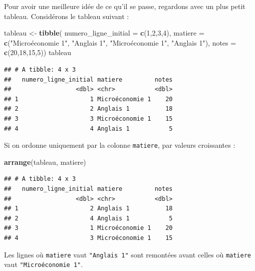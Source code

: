 \documentclass[
  11pt,
]{book}
\newenvironment{Shaded}{\begin{snugshade}}{\end{snugshade}}
\newcommand{\AttributeTok}[1]{\textcolor[rgb]{0.13,0.29,0.53}{#1}}
\newcommand{\DecValTok}[1]{\textcolor[rgb]{0.00,0.00,0.81}{#1}}
\newcommand{\FunctionTok}[1]{\textcolor[rgb]{0.13,0.29,0.53}{\textbf{#1}}}
\newcommand{\NormalTok}[1]{#1}
\newcommand{\OtherTok}[1]{\textcolor[rgb]{0.56,0.35,0.01}{#1}}
\newcommand{\StringTok}[1]{\textcolor[rgb]{0.31,0.60,0.02}{#1}}
\numberwithin{equation}{section}
\numberwithin{countremarque}{section}
\newenvironment{notebox}{
  \begin{tcolorbox}[breakable, colback=jaune,coltext=black,
                  colframe=grisfonce]}
 {\end{tcolorbox}}
\begin{document}
\begin{notebox}

Pour avoir une meilleure idée de ce qu'il se passe, regardons avec un plus petit tableau. Considérons le tableau suivant :

\begin{Shaded}
\begin{Highlighting}[]
\NormalTok{tableau }\OtherTok{\textless{}{-}} 
  \FunctionTok{tibble}\NormalTok{(}
    \AttributeTok{numero\_ligne\_initial =} \FunctionTok{c}\NormalTok{(}\DecValTok{1}\NormalTok{,}\DecValTok{2}\NormalTok{,}\DecValTok{3}\NormalTok{,}\DecValTok{4}\NormalTok{),}
    \AttributeTok{matiere =} \FunctionTok{c}\NormalTok{(}\StringTok{"Microéconomie 1"}\NormalTok{, }\StringTok{"Anglais 1"}\NormalTok{,}
                \StringTok{"Microéconomie 1"}\NormalTok{, }\StringTok{"Anglais 1"}\NormalTok{),}
    \AttributeTok{notes =} \FunctionTok{c}\NormalTok{(}\DecValTok{20}\NormalTok{,}\DecValTok{18}\NormalTok{,}\DecValTok{15}\NormalTok{,}\DecValTok{5}\NormalTok{))}
\NormalTok{tableau}
\end{Highlighting}
\end{Shaded}

\begin{lstlisting}
## # A tibble: 4 x 3
##   numero_ligne_initial matiere         notes
##                  <dbl> <chr>           <dbl>
## 1                    1 Microéconomie 1    20
## 2                    2 Anglais 1          18
## 3                    3 Microéconomie 1    15
## 4                    4 Anglais 1           5
\end{lstlisting}

Si on ordonne uniquement par la colonne \texttt{matiere}, par valeurs croissantes :

\begin{Shaded}
\begin{Highlighting}[]
\FunctionTok{arrange}\NormalTok{(tableau, matiere)}
\end{Highlighting}
\end{Shaded}

\begin{lstlisting}
## # A tibble: 4 x 3
##   numero_ligne_initial matiere         notes
##                  <dbl> <chr>           <dbl>
## 1                    2 Anglais 1          18
## 2                    4 Anglais 1           5
## 3                    1 Microéconomie 1    20
## 4                    3 Microéconomie 1    15
\end{lstlisting}

Les lignes où \texttt{matiere} vaut \texttt{"Anglais\ 1"} sont remontées avant celles où \texttt{matiere} vaut \texttt{"Microéconomie\ 1"}.


\end{notebox}
\end{document}
